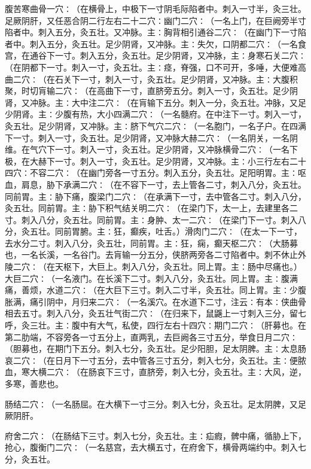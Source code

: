 \documentclass[a4paper,12pt,UTF8,twoside]{ctexbook}
\begin{document}
腹苦寒曲骨一穴∶（在横骨上，中极下一寸阴毛际陷者中。刺入一寸半，灸三壮。足厥阴肝，又任恶合阴二行左右二十二穴∶幽门二穴∶（一名上门，在巨阙旁半寸陷者中。刺入五分，灸五壮。又冲脉。主∶胸背相引通谷二穴∶（在幽门下一寸陷者中。刺入五分，灸五壮。足少阴肾，又冲脉。主∶失欠，口阴都二穴∶（一名食宫，在通谷下一寸。刺入五分，灸五壮。足少阴肾，又冲脉，主∶身寒石关二穴∶（在阴都下一寸。刺入一寸，灸五壮。主∶痉，脊强，口不可开，多唾，大便难高曲二穴∶（在石关下一寸，刺入一寸，灸五壮。足少阴肾，又冲脉。主∶大腹积聚，时切肓输二穴∶（在高曲下一寸，直脐旁五分。刺入一寸，灸五壮。足少阴肾，又冲脉。主∶大中注二穴∶（在肓输下五分。刺入一分，灸五壮。冲脉，又足少阴肾。主∶少腹有热，大小四满二穴∶（一名髓府。在中注下一寸。刺入一寸，灸五壮。足少阴肾，又冲脉。主∶脐下气穴二穴∶（一名胞门，一名子户。在四满下一寸。刺入一寸，灸五壮。足少阴肾，又冲脉大赫二穴∶（一名阴关，一名阴维。在气穴下一寸。刺入一寸，灸五壮。足少阴肾，又冲脉横骨二穴∶（一名下极，在大赫下一寸。刺入一寸，灸五壮。足少阴肾，又冲脉。主∶小三行左右二十四穴∶不容二穴∶（在幽门旁各一寸五分。刺入五分，灸五壮。足阳明胃。主∶呕血，肩息，胁下承满二穴∶（在不容下一寸，去上管各二寸，刺入八分，灸五壮。同前胃。主∶胁下痛，腹梁门二穴∶（在承满下一寸，去中管各二寸。刺入八分，灸五壮。同前胃。主∶胁下积气结关明二穴∶（在梁门下，太一上，去建里各二寸。刺入八分，灸五壮。同前胃。主∶身肿、太一二穴∶（在梁门下一寸。刺入八分，灸五壮。同前胃腑。主∶狂，癫疾，吐舌。）滑肉门二穴∶（在太一下一寸，去水分二寸。刺入八分，灸五壮，同前胃。主∶狂，痫，癫天枢二穴∶（大肠募也，一名长溪，一名谷门。去肓输一分五分，侠脐两旁各二寸陷者中。刺不休止外陵二穴∶（在天枢下，大巨上。刺入八分，灸五壮。同上胃。主∶肠中尽痛也。）大巨二穴∶（一名液门。在长溪下二寸。刺入八分，灸五壮。同上胃。主∶腹满痛，善烦，水道二穴∶（在大巨下三寸。刺入二寸半，灸五壮。同上胃。主∶少腹胀满，痛引阴中，月归来二穴∶（一名溪穴。在水道下二寸，注云∶有本∶侠曲骨相去五寸。刺入八分，灸五壮气街二穴∶（在归来下，鼠鼷上一寸刺入三分，留七呼，灸三壮。主∶腹中有大气，私使，四行左右十四穴∶期门二穴∶（肝募也。在第二肋端，不容旁各一寸五分上，直两乳，去巨阙各三寸五分，举食日月二穴∶（胆募也，在期门下五分。刺入七分，灸五壮。足少阳胆，足太阴脾。主∶太息肠哀二穴∶（在日月下一寸五分，去中管各三寸五分，刺入七分，灸五壮。主∶便脓血，寒大横二穴∶（在肠哀下三寸，直脐旁，刺入七分，灸五壮。主∶大风，逆，多寒，善悲也。

肠结二穴∶（一名肠屈。在大横下一寸三分。刺入七分，灸五壮。足太阴脾，又足厥阴肝。

府舍二穴∶（在肠结下三寸。刺入七分，灸五壮。主∶疝瘕，髀中痛，循胁上下，抢心，腹衡门二穴∶（一名慈宫，去大横五寸，在府舍下，横骨两端约中。刺入七分，灸五壮。
\end{document}
